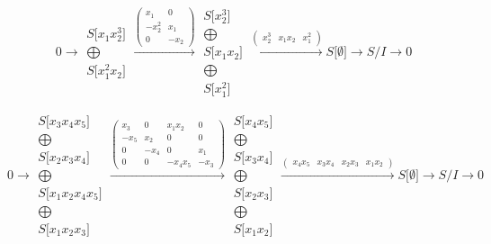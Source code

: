 \documentclass[12pt,a3paper,landscape]{amsart}
\numberwithin{equation}{section}
\theoremstyle{plain}
\theoremstyle{definition}
\begin{document}
$$
0 \rightarrow \begin{matrix}
S \lbrack x_{1}x_{2}^{3} \rbrack \\ \bigoplus \\
S \lbrack x_{1}^{2}x_{2} \rbrack
\end{matrix}
\xrightarrow{\left( \begin{matrix}
x_{1} & 0 \\
-x_{2}^{2} & x_{1} \\
0 & -x_{2}
\end{matrix} \right)}\begin{matrix}
S \lbrack x_{2}^{3} \rbrack \\ \bigoplus \\
S \lbrack x_{1}x_{2} \rbrack \\ \bigoplus \\
S \lbrack x_{1}^{2} \rbrack
\end{matrix}
\xrightarrow{\left( \begin{matrix}
x_{2}^{3} & x_{1}x_{2} & x_{1}^{2}
\end{matrix} \right)}S \lbrack \emptyset \rbrack \rightarrow S/I \rightarrow 0
$$

$$
0 \rightarrow \begin{matrix}
S \lbrack x_{3}x_{4}x_{5} \rbrack \\ \bigoplus \\
S \lbrack x_{2}x_{3}x_{4} \rbrack \\ \bigoplus \\
S \lbrack x_{1}x_{2}x_{4}x_{5} \rbrack \\ \bigoplus \\
S \lbrack x_{1}x_{2}x_{3} \rbrack
\end{matrix}
\xrightarrow{\left( \begin{matrix}
x_{3} & 0 & x_{1}x_{2} & 0 \\
-x_{5} & x_{2} & 0 & 0 \\
0 & -x_{4} & 0 & x_{1} \\
0 & 0 & -x_{4}x_{5} & -x_{3}
\end{matrix} \right)}\begin{matrix}
S \lbrack x_{4}x_{5} \rbrack \\ \bigoplus \\
S \lbrack x_{3}x_{4} \rbrack \\ \bigoplus \\
S \lbrack x_{2}x_{3} \rbrack \\ \bigoplus \\
S \lbrack x_{1}x_{2} \rbrack
\end{matrix}
\xrightarrow{\left( \begin{matrix}
x_{4}x_{5} & x_{3}x_{4} & x_{2}x_{3} & x_{1}x_{2}
\end{matrix} \right)}S \lbrack \emptyset \rbrack \rightarrow S/I \rightarrow 0
$$
\end{document}
